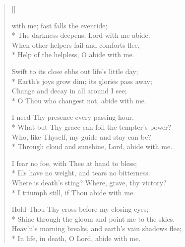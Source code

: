 \newHymn
{}
\settowidth{\versewidth}{The darkness deepens; Lord with me abide pls}
\begin{verse}[\versewidth]

 with me; fast falls the eventide;\\*
The darkness deepens; Lord with me abide.\\
When other helpers fail and comforts flee,\\*
Help of the helpless, O abide with me.

Swift to its close ebbs out life’s little day;\\*
Earth’s joys grow dim; its glories pass away;\\
Change and decay in all around I see;\\*
O Thou who changest not, abide with me.




I need Thy presence every passing hour.\\*
What but Thy grace can foil the tempter’s power?\\
Who, like Thyself, my guide and stay can be?\\*
Through cloud and sunshine, Lord, abide with me.

I fear no foe, with Thee at hand to bless;\\*
Ills have no weight, and tears no bitterness.\\
Where is death's sting? Where, grave, thy victory?\\*
I triumph still, if Thou abide with me.

Hold Thou Thy cross before my closing eyes;\\*
Shine through the gloom and point me to the skies.\\
Heav'n's morning breaks, and earth's vain shadows flee;\\*
In life, in death, O Lord, abide with me.

\end{verse}


